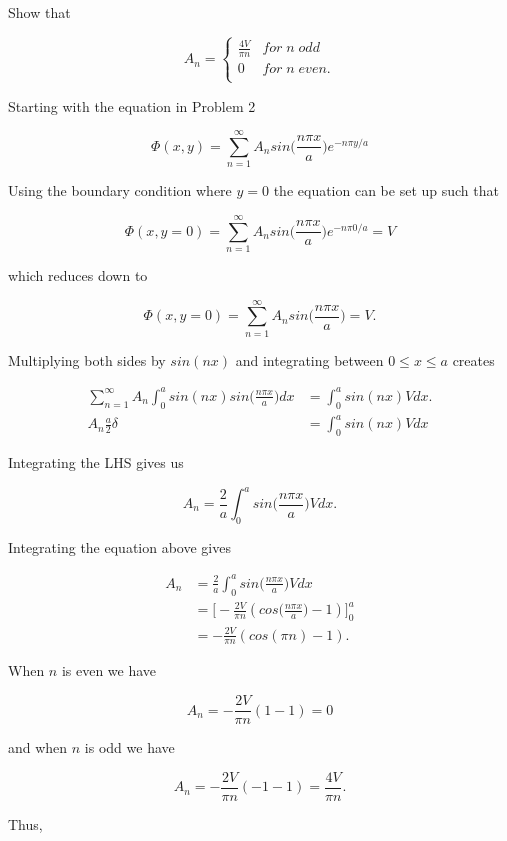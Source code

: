 \documentclass[11pt]{article}
\begin{document}
Show that 

\[ A_{n} = \begin{cases} 
       \frac{4V}{\pi n} & for \; n \; odd \\
      0 & for \; n \; even. \\
   \end{cases}
\]

Starting with the equation in Problem 2

$$
\Phi(x, y) = \sum_{n = 1}^{\infty} A_{n}sin\Big(\frac{n\pi x}{a}\Big) e^{-n\pi y/a}
$$

Using the boundary condition where $y = 0$ the equation can be set up such that

$$
\Phi(x, y = 0) =  \sum_{n = 1}^{\infty} A_{n}sin\Big(\frac{n\pi x}{a}\Big) e^{-n\pi 0/a} = V
$$

which reduces down to 

$$
\Phi(x, y = 0) =  \sum_{n = 1}^{\infty} A_{n}sin\Big(\frac{n\pi x}{a}\Big) = V.
$$

Multiplying both sides by $sin(nx)$ and integrating between $0 \leq x \leq a$ creates

\begin{align*}
\sum_{n = 1}^{\infty} A_{n} \int_{0}^{a} sin(nx) sin\Big(\frac{n\pi x}{a}\Big) dx &=  \int_{0}^{a} sin(nx) V dx. \\
A_{n} \frac{a}{2} \delta &= \int_{0}^{a} sin(nx) V dx
\end{align*}

Integrating the LHS gives us

$$
A_{n} = \frac{2}{a} \int_{0}^{a} sin\Big(\frac{n\pi x}{a}\Big) V dx.
$$

Integrating the equation above gives 

\begin{align*}
    A_{n} &= \frac{2}{a} \int_{0}^{a} sin\Big(\frac{n\pi x}{a}\Big) V dx \\
          &= \Bigg[-\frac{2V}{\pi n} (cos\Big(\frac{n\pi x}{a}\Big) - 1) \Bigg]_{0}^{a} \\
          &= -\frac{2V}{\pi n} (cos(\pi n) - 1).
\end{align*}

When $n$ is even we have

$$
A_{n} = -\frac{2V}{\pi n} (1 - 1) = 0
$$

and when $n$ is odd we have

$$
A_{n} = -\frac{2V}{\pi n} (-1 - 1) = \frac{4V}{\pi n}.
$$

Thus,
\end{document}
